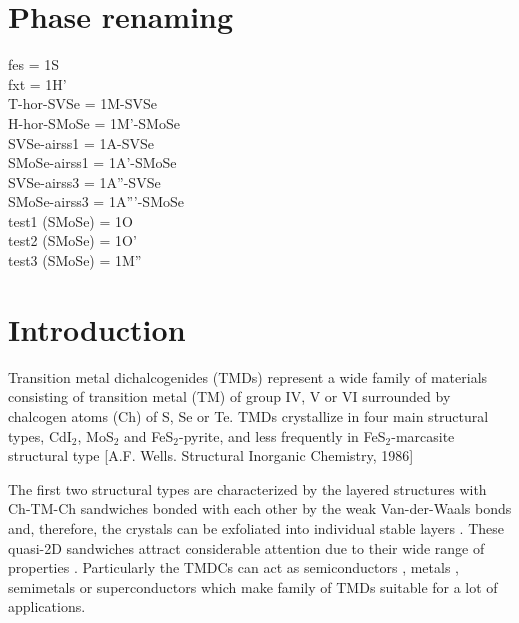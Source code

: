 \documentclass[a4paperm]{article}
\begin{document}
\section*{Phase renaming}
fes = 1S \\
fxt = 1H' \\
T-hor-SVSe = 1M-SVSe \\
H-hor-SMoSe = 1M'-SMoSe \\
SVSe-airss1 = 1A-SVSe \\
SMoSe-airss1 = 1A'-SMoSe \\
SVSe-airss3 = 1A''-SVSe \\
SMoSe-airss3 = 1A'''-SMoSe \\
test1 (SMoSe) = 1O \\
test2 (SMoSe) = 1O' \\
test3 (SMoSe) = 1M'' \\


\section{Introduction}

Transition metal dichalcogenides (TMDs) represent a wide family of materials consisting of transition metal (TM) of group IV, V or VI surrounded by chalcogen atoms (Ch) of S, Se or Te. 
TMDs crystallize in four main structural types, CdI$_2$, MoS$_2$ and FeS$_2$-pyrite, and less frequently in FeS$_2$-marcasite structural type \cite{wells} [A.F. Wells. Structural Inorganic Chemistry, 1986]

The first two structural types are characterized by the layered structures with Ch-TM-Ch sandwiches bonded with each other by the weak Van-der-Waals bonds and, therefore, the crystals can be exfoliated into individual stable layers \cite{zhang2020intercalation}. These quasi-2D sandwiches attract considerable attention due to their wide range of properties \cite{li2017graphene, SHI20181, xi2016ising, hu2019recent, pi2019recent}. 
Particularly the TMDCs can act as semiconductors \cite{nayeri2018transport}, metals \cite{zhao20212d}, semimetals \cite{xu2020high, zhao2020observation} or superconductors \cite{wang2020nodeless,hsu2017topological} which make family of TMDs suitable for a lot of applications. 
\end{document}
